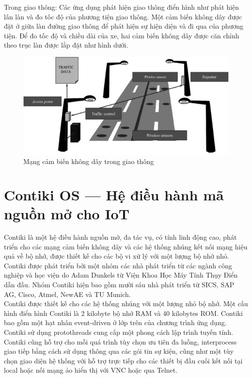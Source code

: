 \documentclass{report}
\begin{document}
Trong giao thông: Các ứng dụng phát hiện giao thông điển hình như phát hiện lấn làn và đo tốc độ của phương tiện giao thông. Một cảm biến không dây được đặt ở giữa làn đường giao thông để phát hiện sự hiện diện và đi qua của phương tiện. Để đo tốc độ và chiều dài của xe, hai cảm biến không dây được căn chỉnh theo trục làn được lắp đặt như hình dưới.
\begin{figure}[h]
	\centering
	\includegraphics[scale = 0.5]{fig12.png}
	\caption{Mạng cảm biến không dây trong giao thông}
	\label{fig:Graph12}
\end{figure}
\newpage
\section{Contiki OS — Hệ điều hành mã nguồn mở cho IoT}
Contiki là một hệ điều hành nguồn mở, đa tác vụ, có tính linh động cao, phát triển
cho các mạng cảm biến không dây và các hệ thống nhúng kết nối mạng hiệu quả về
bộ nhớ, được thiết kế cho các bộ vi xử lý với một lượng bộ nhớ nhỏ. Contiki được phát triển bởi một nhóm các nhà phát triển từ các ngành công nghiệp và học viện do Adam Dunkels từ Viện Khoa Học Máy Tính Thụy Điển dẫn đầu. Nhóm Contiki hiện bao gồm mười sáu nhà phát triển từ SICS, SAP AG, Cisco, Atmel, NewAE và TU Munich. \\

Contiki được thiết kế cho các hệ thống nhúng với một lượng nhỏ bộ nhớ. Một cấu hình điển
hình Contiki là 2 kilobyte bộ nhớ RAM và 40 kilobytes ROM. Contiki bao gồm một hạt nhân
event-driven ở lớp trên của chương trình ứng dụng. Contiki sử dụng protothreads cung cấp một
phong cách lập trình tuyến tính. Contiki cũng hỗ trợ cho mỗi quá trình tùy chọn ưu tiên đa
luồng, interprocess giao tiếp bằng cách sử dụng thông qua các gói tin sự kiện, cũng như một
tùy chọn giao diện hệ thống với hỗ trợ trực tiếp cho các thiết bị đầu cuối kết nối tại local hoặc
nối mạng ảo hiển thị với VNC hoặc qua Telnet. \\ 
\end{document}
